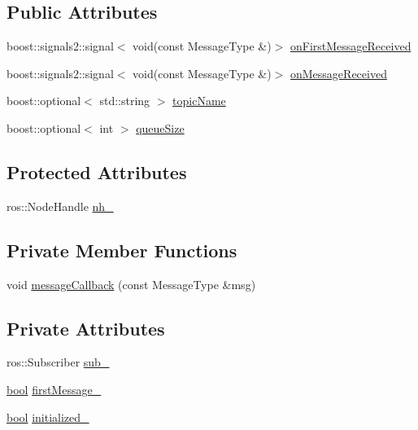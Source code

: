\subsection*{Public Attributes}
\begin{DoxyCompactItemize}
\item 
boost\+::signals2\+::signal$<$ void(const Message\+Type \&)$>$ \hyperlink{classsmacc_1_1SmaccSubscriberClient_a9c77384c3271293906b47c1e94d55036}{on\+First\+Message\+Received}
\item 
boost\+::signals2\+::signal$<$ void(const Message\+Type \&)$>$ \hyperlink{classsmacc_1_1SmaccSubscriberClient_afa92da03ebd637e2565eee5cf226ca43}{on\+Message\+Received}
\item 
boost\+::optional$<$ std\+::string $>$ \hyperlink{classsmacc_1_1SmaccSubscriberClient_a573625f4b97228c0e9110fb4538722f2}{topic\+Name}
\item 
boost\+::optional$<$ int $>$ \hyperlink{classsmacc_1_1SmaccSubscriberClient_ac75e9d490c0383a7a686f05b2d4fcc68}{queue\+Size}
\end{DoxyCompactItemize}
\subsection*{Protected Attributes}
\begin{DoxyCompactItemize}
\item 
ros\+::\+Node\+Handle \hyperlink{classsmacc_1_1SmaccSubscriberClient_a687bdd388ad68d5831138e7eb70fb9ae}{nh\+\_\+}
\end{DoxyCompactItemize}
\subsection*{Private Member Functions}
\begin{DoxyCompactItemize}
\item 
void \hyperlink{classsmacc_1_1SmaccSubscriberClient_aeeaa8569c2abca5ec9639f975d2c4226}{message\+Callback} (const Message\+Type \&msg)
\end{DoxyCompactItemize}
\subsection*{Private Attributes}
\begin{DoxyCompactItemize}
\item 
ros\+::\+Subscriber \hyperlink{classsmacc_1_1SmaccSubscriberClient_a1570353cc228141c8a401776e2ef31c9}{sub\+\_\+}
\item 
\hyperlink{classbool}{bool} \hyperlink{classsmacc_1_1SmaccSubscriberClient_acfb1bf9d488d40a55c61861e2bc39346}{first\+Message\+\_\+}
\item 
\hyperlink{classbool}{bool} \hyperlink{classsmacc_1_1SmaccSubscriberClient_a38ca48bff3e170c1cfd6acff9da7661c}{initialized\+\_\+}
\end{DoxyCompactItemize}


